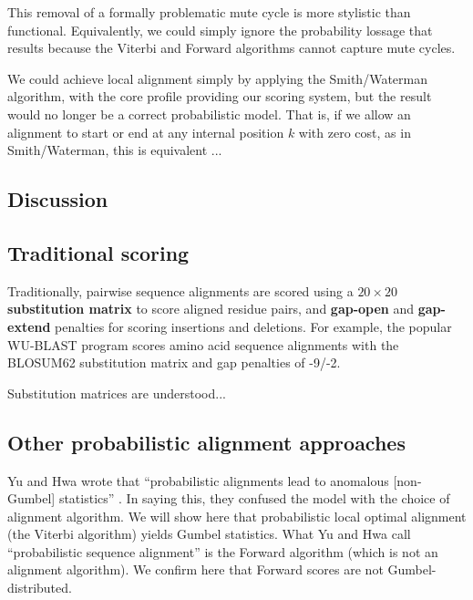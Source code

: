 \documentclass[11pt]{article}
\begin{document}
This removal of a formally problematic mute cycle is more stylistic
than functional. Equivalently, we could simply ignore the probability
lossage that results because the Viterbi and Forward algorithms cannot
capture mute cycles. 
























We could achieve local alignment simply by applying the Smith/Waterman
algorithm, with the core profile providing our scoring system, but the
result would no longer be a correct probabilistic model. That is, if
we allow an alignment to start or end at any internal position $k$
with zero cost, as in Smith/Waterman, this is equivalent ...



\subsection{Discussion}

\subsection{Traditional scoring}

Traditionally, pairwise sequence alignments are scored using a $20
\times 20$ \textbf{substitution matrix} to score aligned residue
pairs, and \textbf{gap-open} and \textbf{gap-extend} penalties for
scoring insertions and deletions. For example, the popular WU-BLAST
program scores amino acid sequence alignments with the BLOSUM62
substitution matrix and gap penalties of -9/-2. 

Substitution matrices are understood...

\subsection{Other probabilistic alignment approaches}

Yu and Hwa wrote that ``probabilistic alignments lead to anomalous
[non-Gumbel] statistics'' \citep{YuHwa01}. In saying this, they
confused the model with the choice of alignment algorithm. We will
show here that probabilistic local optimal alignment (the Viterbi
algorithm) yields Gumbel statistics.  What Yu and Hwa call
``probabilistic sequence alignment'' is the Forward algorithm (which
is not an alignment algorithm). We confirm here that Forward scores
are not Gumbel-distributed.
\end{document}
